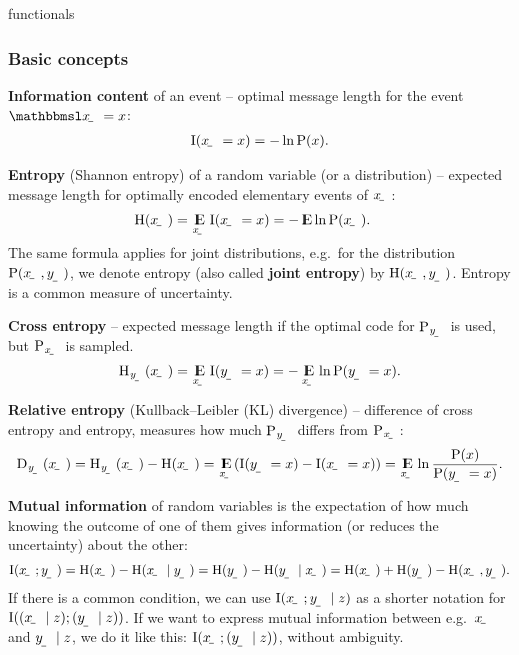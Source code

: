\documentclass{article}
\begin{document}
functionals

\subsubsection{Basic concepts}

\textbf{Information content} of an event -- optimal message length for the event $\event{\rvar x=x}$:
\begin{align}
\I(\rvar x=x) = -\ln\P(x) \text.
\end{align}

\textbf{Entropy} (Shannon entropy) of a random variable (or a distribution) -- expected message length for optimally encoded elementary events of $\rvar x$:
\begin{align}
    \H(\rvar x) &= \E_{\rvar x}\I(\rvar x=x) = -\E\ln\P(\rvar x) \text.
\end{align}
The same formula applies for joint distributions, e.g.\ for the distribution $\P(\rvar x,\rvar y)$, we denote entropy (also called \textbf{joint entropy}) by $\H(\rvar x,\rvar y)$. Entropy is a common measure of uncertainty.

\textbf{Cross entropy} -- expected message length if the optimal code for $\P_\rvar{y}$ is used, but $\P_\rvar{x}$ is sampled.
\begin{align}
    \H_\rvar{y}(\rvar x) = \E_{\rvar x}\I(\rvar y=x) = -\E_{\rvar x}\ln\P(\rvar y=x) \text.
\end{align}

\textbf{Relative entropy} (Kullback–Leibler (KL) divergence) -- difference of cross entropy and entropy, measures how much $\P_\rvar{y}$ differs from $\P_\rvar{x}$:
\begin{align}
    \Dist_\rvar{y}(\rvar x) = \H_\rvar{y}(\rvar x) - \H(\rvar x) = \E_\rvar{x}\del{\I(\rvar y=x)-\I(\rvar x=x)} = \E_\rvar{x}\ln\frac{\P(x)}{\P(\rvar y=x)} \text.
\end{align}

\textbf{Mutual information} of random variables is the expectation of how much knowing the outcome of one of them gives information (or reduces the uncertainty) about the other:
\begin{align}
    \I(\rvar x; \rvar y) = \H(\rvar x) - \H(\rvar x\mid\rvar y) = \H(\rvar y) - \H(\rvar y\mid\rvar x) = \H(\rvar x) +\H(\rvar y) - \H(\rvar x, \rvar y) \text.
\end{align}
If there is a common condition, we can use $\I\del{\rvar x; \rvar y\mid z}$ as a shorter notation for $\I\del{(\rvar x\mid z); (\rvar y\mid z)}$. If we want to express mutual information between e.g.\ $\rvar x$ and $\rvar y\mid z$, we do it like this: $\I(\rvar x;(\rvar y\mid z))$, without ambiguity.
\end{document}
